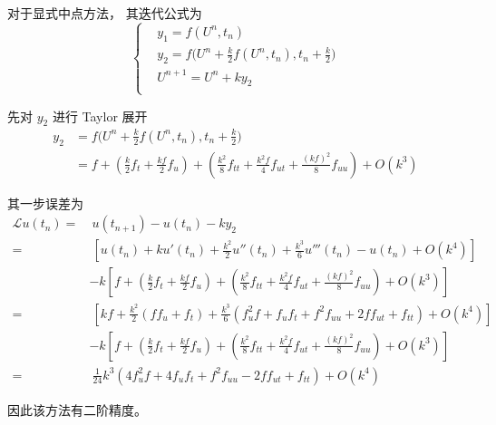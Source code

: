 \documentclass[a4paper]{article}
\begin{document}
\par 对于显式中点方法， 其迭代公式为
\begin{equation}
    \left\{
        \begin{aligned}
            &y_1 = f(U^n,t_n) \\
            &y_2 = f\Big(U^n+\frac{k}{2}f(U^n,t_n),t_{n}+\frac{k}{2}\Big) \\
            &U^{n+1} = U^n + ky_2 \\
        \end{aligned}
    \right.
\end{equation}
\par 先对 $y_2$ 进行 Taylor 展开
\begin{equation}
    \begin{aligned}
        y_2 &= f\Big(U^n+\frac{k}{2}f(U^n,t_n),t_{n}+\frac{k}{2}\Big) \\
        &= f 
        + \left(\frac{k}{2}f_t + \frac{kf}{2} f_u\right)
        + \left(
            \frac{k^2}{8} f_{tt} + \frac{k^2f}{4} f_{ut} + \frac{(kf)^2}{8}  f_{uu}
        \right) + O(k^3)
    \end{aligned}
\end{equation} 
\par 其一步误差为
\begin{equation}
    \begin{aligned}
        \mathcal{L}u(t_n)
        =&\ u(t_{n+1}) - u(t_n) - ky_2 \\
        =&\ \left[
            u(t_n) +ku'(t_n)+\frac{k^2}{2}u''(t_n)+\frac{k^3}{6}u'''(t_n) - u(t_n) + O(k^4)
        \right]  \\
        &- k\left[
            f 
            + \left(\frac{k}{2}f_t + \frac{kf}{2} f_u\right)
            + \left(
                \frac{k^2}{8} f_{tt} + \frac{k^2f}{4} f_{ut} + \frac{(kf)^2}{8}  f_{uu}
            \right) + O(k^3)
        \right]\\
        =&\ \left[
            kf+\frac{k^2}{2}\left(ff_u+f_t\right)+\frac{k^3}{6}\left(
                f^2_uf+f_uf_t+f^2f_{uu}+2ff_{ut}+f_{tt}
            \right) + O(k^4)
        \right]  \\
        &- k\left[
            f 
            + \left(\frac{k}{2}f_t + \frac{kf}{2} f_u\right)
            + \left(
                \frac{k^2}{8} f_{tt} + \frac{k^2f}{4} f_{ut} + \frac{(kf)^2}{8}  f_{uu}
            \right) + O(k^3)
        \right]\\
        =&\ \frac{1}{24}k^3\left(
            4f^2_uf+4f_uf_t+f^2f_{uu}-2ff_{ut}+f_{tt}
        \right) + O(k^4)
    \end{aligned}
\end{equation}
\par 因此该方法有二阶精度。
\end{document}
